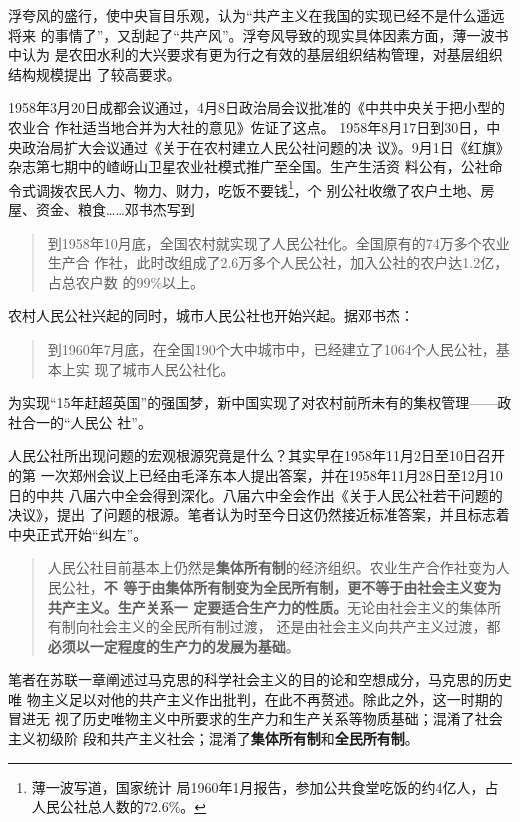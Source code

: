 浮夸风的盛行，使中央盲目乐观，认为“共产主义在我国的实现已经不是什么遥远将来
的事情了”，又刮起了“共产风”。浮夸风导致的现实具体因素方面，薄一波书中认为
是农田水利的大兴要求有更为行之有效的基层组织结构管理，对基层组织结构规模提出
了较高要求。

1958年3月20日成都会议通过，4月8日政治局会议批准的《中共中央关于把小型的农业合
作社适当地合并为大社的意见》佐证了这点。\cite[728-730]{boyibo}
1958年8月17日到30日，中央政治局扩大会议通过《关于在农村建立人民公社问题的决
议》。9月1日《红旗》杂志第七期中的嵖岈山卫星农业社模式推广至全国。生产生活资
料公有，公社命令式调拨农民人力、物力、财力，吃饭不要钱\footnote{薄一波写道，国家统计
  局1960年1月报告，参加公共食堂吃饭的约4亿人，占人民公社总人数的72.6\%。}，个
别公社收缴了农户土地、房屋、资金、粮食……邓书杰写到
\begin{quotation}
  到1958年10月底，全国农村就实现了人民公社化。全国原有的74万多个农业生产合
  作社，此时改组成了2.6万多个人民公社，加入公社的农户达1.2亿，占总农户数
  的99\%以上。
\end{quotation}

农村人民公社兴起的同时，城市人民公社也开始兴起。据邓书杰：
\begin{quotation}
  到1960年7月底，在全国190个大中城市中，已经建立了1064个人民公社，基本上实
  现了城市人民公社化。
\end{quotation}

为实现“15年赶超英国”的强国梦，新中国实现了对农村前所未有的集权管理——政社合一的“人民公
社”。

人民公社所出现问题的宏观根源究竟是什么？其实早在1958年11月2日至10日召开的第
一次郑州会议上已经由毛泽东本人提出答案，并在1958年11月28日至12月10日的中共
八届六中全会得到深化。八届六中全会作出《关于人民公社若干问题的决议》，提出
了问题的根源。笔者认为时至今日这仍然接近标准答案，并且标志着中央正式开始“纠左”。
\begin{quotation}
  人民公社目前基本上仍然是\textbf{集体所有制}的经济组织。农业生产合作社变为人民公社，\textbf{不
  等于由集体所有制变为全民所有制，更不等于由社会主义变为共产主义。生产关系一
  定要适合生产力的性质。}无论由社会主义的集体所有制向社会主义的全民所有制过渡，
  还是由社会主义向共产主义过渡，都\textbf{必须以一定程度的生产力的发展为基础}。
\end{quotation}

笔者在苏联一章阐述过马克思的科学社会主义的目的论和空想成分，马克思的历史唯
物主义足以对他的共产主义作出批判，在此不再赘述。除此之外，这一时期的冒进无
视了历史唯物主义中所要求的生产力和生产关系等物质基础；混淆了社会主义初级阶
段和共产主义社会；混淆了\textbf{集体所有制}和\textbf{全民所有制}。

